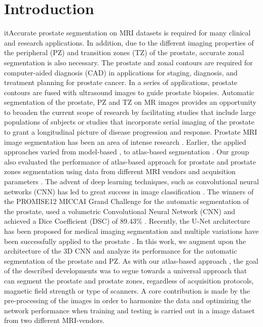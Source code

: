 \section{Introduction}
\label{sec:intro}
itAccurate prostate segmentation on MRI datasets is required for many clinical and research applications. In addition, due to the different imaging properties of the peripheral (PZ) and transition zones (TZ) of the prostate, accurate zonal segmentation is also necessary. The prostate and zonal contours are required for computer-aided diagnosis (CAD) in applications for staging, diagnosis, and treatment planning for prostate cancer. In a series of applications, prostate contours are fused with ultrasound images to guide prostate biopsies. Automatic segmentation of the prostate, PZ and TZ on MR images provides an opportunity to broaden the current scope of research by facilitating studies that include large populations of subjects or studies that incorporate serial imaging of the prostate to grant a longitudinal picture of disease progression and response.  Prostate MRI image segmentation has been an area of intense research \cite{litjens2014evaluation}. Earlier, the applied approaches varied from model-based \cite{chowdhury2012concurrent,toth2012multifeature}, to atlas-based segmentation \cite{4_klein2008automatic,5_cheng2014atlas,6_xie2014low,7_tian2015fully,8_korsager2015use,9_chilali2016gland}.  Our group also evaluated the performance of atlas-based approach for prostate and prostate zones segmentation using data from different MRI vendors and acquisition parameters \cite{10_padgett2018towards}. The advent of deep learning techniques, such as convolutional neural networks (CNN) has led to great success in image classification \cite{11_krizhevsky2012imagenet,12_simonyan2011immediate}.  The winners of the PROMISE12 MICCAI Grand Challenge  for the automatic segmentation of the prostate,\cite{litjens2014evaluation}  used a volumetric Convolutional Neural Network (CNN) and achieved a Dice Coefficient (DSC) of 89.43\% \cite{yu2017volumetric}.  Recently, the U-Net architecture has been proposed \cite{13_ronneberger2015u} for medical imaging segmentation and multiple variations have been successfully applied to the prostate  \cite{anneke}. 
In this work, we augment upon the architecture of the 3D
CNN and analyze its performance for the automatic segmentation of the  prostate and PZ. As with our atlas-based approach \cite{10_padgett2018towards}, the goal of the described developments was to segue towards a universal approach that can segment the prostate and prostate zones, regardless of acquisition protocols, magnetic field strength or type of scanners. A core contribution is made by the pre-processing of the images in order to harmonize the data and optimizing the network performance when training and testing is carried out in a image dataset from two different MRI-vendors. 

